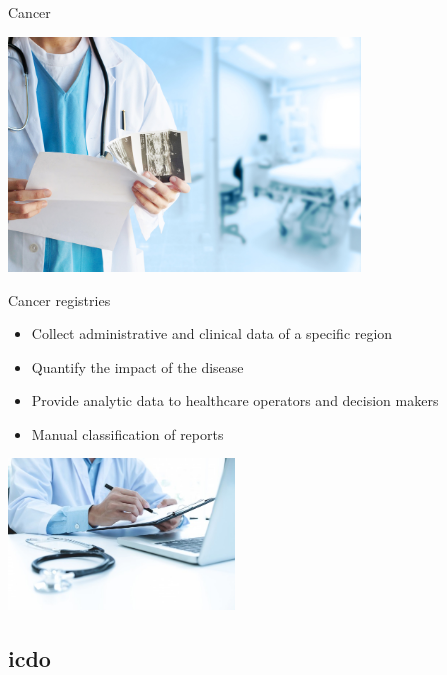 \begin{frame}{Cancer}
  \begin{center}
    \includegraphics[width=0.7\textwidth]{img/doctor.jpg}
  \end{center}  
\end{frame}

\begin{frame}{Cancer registries}
  \begin{itemize}
  \item \alert{Collect} administrative and clinical data of a specific region
  \item \alert{Quantify} the impact of the disease
  \item Provide \alert{analytic} data to healthcare operators and
    decision makers
  \item \alert{Manual} classification of reports
  \end{itemize}
  \begin{center}
    \includegraphics[width=0.45\textwidth]{img/doctorPC.jpg}
  \end{center}
\end{frame}

\subsection{\acs{icdo}}

